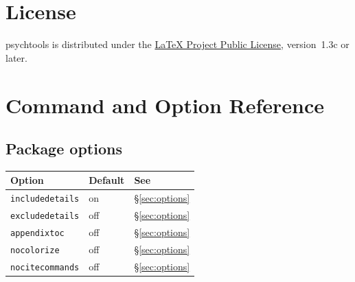 \documentclass[a4paper,11pt]{article}
\newcommand{\pkg}[1]{\textsf{#1}}
\newcommand{\opt}[1]{\texttt{#1}}
\begin{document}
\section{License}

\pkg{psychtools} is distributed under the
\href{https://www.latex-project.org/lppl.txt}{LaTeX Project Public
License}, version~1.3c or later.

\appendix
\section{Command and Option Reference}
\label{sec:ref}

\subsection*{Package options}
\begin{center}
\begin{tabular}{lll}
\toprule
Option & Default & See \\
\midrule
\opt{includedetails}  & on  & \S\ref{sec:options} \\
\opt{excludedetails}  & off & \S\ref{sec:options} \\
\opt{appendixtoc}     & off & \S\ref{sec:options} \\
\opt{nocolorize}      & off & \S\ref{sec:options} \\
\opt{nocitecommands}  & off & \S\ref{sec:options} \\
\bottomrule
\end{tabular}
\end{center}
\end{document}
